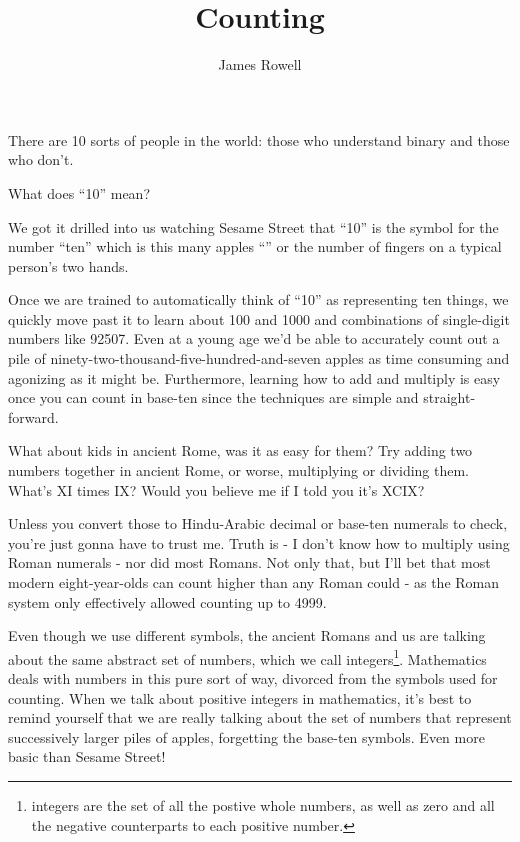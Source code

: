 \documentclass{article}
\title{Counting}
\author{James Rowell}
\begin{document}
\maketitle
\begin{em}
\centerline{\small{}There are 10 sorts of people in the world: those who understand binary and those who don't.}
\end{em}
\bigskip

What does ``10'' mean?

We got it drilled into us watching Sesame Street that ``10'' is the symbol for the number
``ten'' which is this many apples
``\faApple{}\faApple{}\faApple{}\faApple{}\faApple{}\faApple{}\faApple{}\faApple{}\faApple{}\faApple{}''
or the number of fingers on a typical person's two hands.

Once we are trained to automatically think
of ``10'' as representing ten things, we quickly move past it to learn about 100 and 1000
and combinations of single-digit numbers like 92507. Even at a young age we'd
be able to accurately count out a pile of
ninety-two-thousand-five-hundred-and-seven apples as time consuming and agonizing as it might be.
Furthermore, learning how to add and multiply is easy once you can count in
base-ten since the techniques are simple and straight-forward.

What about kids in ancient Rome, was it as easy for them?
Try adding two numbers together in ancient Rome, or worse,
multiplying or dividing them.
What's XI times IX? Would you believe me if I told
you it's XCIX?

Unless you convert those to Hindu-Arabic decimal or base-ten numerals to check,
you're just gonna have to trust me.
Truth is - I don't know how to multiply using Roman
numerals - nor did most Romans. Not only that,
but I'll bet that most modern eight-year-olds 
can count higher than any Roman could - as the
Roman system only effectively allowed counting up to 4999.

Even though we use different symbols, the ancient Romans and us
are talking about the same abstract set of numbers, which we call integers\footnote{integers are 
the set of all the postive whole numbers, as well as zero and all the negative counterparts to each positive number.
}.
Mathematics deals with numbers in this pure sort of way, divorced from the symbols used for counting.
When we talk about positive integers in mathematics, it's best to remind yourself
that we are really talking about the set of numbers 
that represent successively larger piles of apples, forgetting the base-ten symbols.
Even more basic than Sesame Street!
\end{document}

